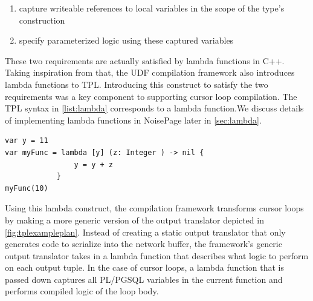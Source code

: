 \documentclass[12pt]{cmuthesis}
\newcommand{\sysname}{NoisePage\xspace}
\begin{document}
\begin{enumerate}
    \item capture writeable references to local variables in the scope of the type's construction
    \item specify parameterized logic using these captured variables
\end{enumerate}

These two requirements are actually satisfied by lambda functions in C++. Taking inspiration from that, the UDF compilation framework also introduces lambda functions to TPL. Introducing this construct to satisfy the two requirements was a key component to supporting cursor loop compilation. The TPL syntax in \cref{list:lambda} corresponds to a lambda function.We discuss details of implementing lambda functions in \sysname later in \cref{sec:lambda}.\\

      \begin{listing}
        \begin{verbatim}
var y = 11
var myFunc = lambda [y] (z: Integer ) -> nil {
                y = y + z
            }
myFunc(10)
        \end{verbatim}
        \caption{Lambda function example in TPL. The variable \texttt{y} is captured by \texttt{myFunc}. \texttt{myFunc} takes in an integer input and does not output anything. It adds the input to the captured \texttt{y} variable. An invocation of \texttt{myFunc} follows.}
        \label{list:lambda}
        \end{listing}

Using this lambda construct, the compilation framework transforms cursor loops by making a more generic version of the output translator depicted in \cref{fig:tplexampleplan}. Instead of creating a static output translator that only generates code to serialize into the network buffer, the framework's generic output translator takes in a lambda function that describes what logic to perform on each output tuple. In the case of cursor loops, a lambda function that is passed down captures all PL/PGSQL variables in the current function and performs compiled logic of the loop body.\\
\end{document}
